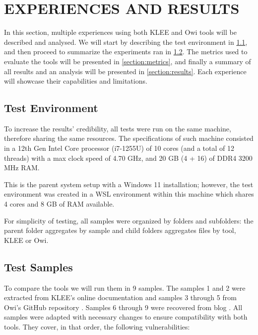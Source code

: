 \section{EXPERIENCES AND RESULTS}\label{chap:experiences}

In this section, multiple experiences using both KLEE and Owi tools will be described and analysed. We will start by describing the test environment in \cref{section:test_environment}, and then proceed to summarize the experiments ran in \cref{section:test_samples}. The metrics used to evaluate the tools will be presented in \cref{section:metrics}, and finally a summary of all results and an analysis will be presented in \cref{section:results}.
Each experience will showcase their capabilities and limitations. 

\subsection{Test Environment}\label{section:test_environment}

To increase the results' credibility, all tests were run on the same machine, therefore sharing the same resources. The specifications of such machine consisted in a 12th Gen Intel Core processor (i7-1255U) of 10 cores (and a total of 12 threads) with a max clock speed of 4.70 GHz, and 20 GB (4 + 16) of DDR4 3200 MHz RAM. 

This is the parent system setup with a Windows 11 installation; however, the test environment was created in a WSL environment within this machine which shares 4 cores and 8 GB of RAM available.

For simplicity of testing, all samples were organized by folders and subfolders: the parent folder aggregates by sample and child folders aggregates files by tool, KLEE or Owi.

\subsection{Test Samples}\label{section:test_samples}

To compare the tools we will run them in 9 samples. The samples 1 and 2 were extracted from KLEE's online documentation \cite{klee_tutorial1,klee_tutorial2} and samples 3 through 5 from Owi's GitHub repository \cite{owi_gh}. 
Samples 6 through 9 were recovered from \citeauthor{ADALogicsKLEE} blog \cite{ADALogicsKLEE}. All samples were adapted with necessary changes to ensure compatibility with both tools. They cover, in that order, the following vulnerabilities: 

